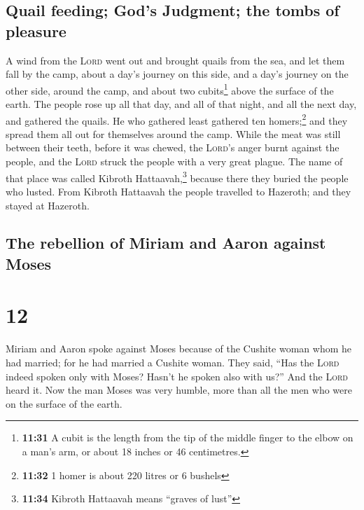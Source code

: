 \hypertarget{quail-feeding-gods-judgment-the-tombs-of-pleasure}{%
\subsection{Quail feeding; God's Judgment; the tombs of
pleasure}\label{quail-feeding-gods-judgment-the-tombs-of-pleasure}}

 A wind from the \textsc{Lord} went out and brought
quails from the sea, and let them fall by the camp, about a day's
journey on this side, and a day's journey on the other side, around the
camp, and about two cubits\footnote{\textbf{11:31} A cubit is the length
  from the tip of the middle finger to the elbow on a man's arm, or
  about 18 inches or 46 centimetres.} above the surface of the earth.
 The people rose up all that day, and all of that night,
and all the next day, and gathered the quails. He who gathered least
gathered ten homers;\footnote{\textbf{11:32} 1 homer is about 220 litres
  or 6 bushels} and they spread them all out for themselves around the
camp.  While the meat was still between their teeth,
before it was chewed, the \textsc{Lord}'s anger burnt against the
people, and the \textsc{Lord} struck the people with a very great
plague.  The name of that place was called Kibroth
Hattaavah,\footnote{\textbf{11:34} Kibroth Hattaavah means ``graves of
  lust''} because there they buried the people who lusted.
 From Kibroth Hattaavah the people travelled to Hazeroth;
and they stayed at Hazeroth.

\hypertarget{the-rebellion-of-miriam-and-aaron-against-moses}{%
\subsection{The rebellion of Miriam and Aaron against
Moses}\label{the-rebellion-of-miriam-and-aaron-against-moses}}

\hypertarget{section-11}{%
\section{12}\label{section-11}}

 Miriam and Aaron spoke against Moses because of the
Cushite woman whom he had married; for he had married a Cushite woman.
 They said, ``Has the \textsc{Lord} indeed spoken only
with Moses? Hasn't he spoken also with us?'' And the \textsc{Lord} heard
it.  Now the man Moses was very humble, more than all the
men who were on the surface of the earth.

